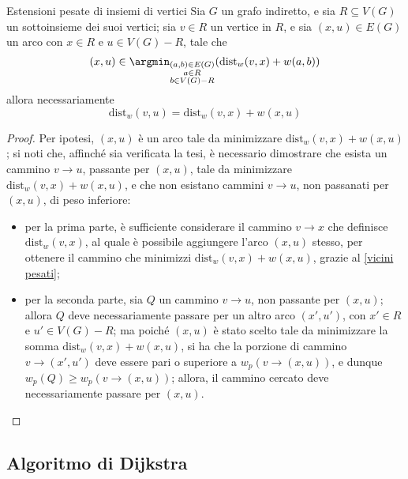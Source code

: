 \documentclass[a4paper, 12pt]{report}
\begin{document}
    \begin{framedthm}[label={dijkstra theorem}]{Estensioni pesate di insiemi di vertici}
        Sia $G$ un grafo indiretto, e sia $R \subseteq V(G)$ un sottoinsieme dei suoi vertici; sia $v\in R$ un vertice in $R$, e sia $(x, u) \in E(G)$ un arco con $x \in R$ e $u \in V(G) - R$, tale che $$(x, u) \in \argmin_{\substack{(a, b) \in E(G) \\ a \in R \\ b \in V(G) - R}}{\left(\mathrm{dist}_w(v, x) + w(a, b)\right)}$$ allora necessariamente $$\mathrm{dist}_w(v, u) = \mathrm{dist}_w(v, x) + w(x, u)$$
    \end{framedthm}

    \begin{proof}
        Per ipotesi, $(x, u)$ è un arco tale da minimizzare $\mathrm{dist}_w(v, x) + w(x, u)$; si noti che, affinché sia verificata la tesi, è necessario dimostrare che esista un cammino $v \rightarrow u$, passante per $(x, u)$, tale da minimizzare $\mathrm{dist}_w(v, x) + w(x, u)$, e che non esistano cammini $v \rightarrow u$, non passanati per $(x, u)$, di peso inferiore:

        \begin{itemize}
            \item per la prima parte, è sufficiente considerare il cammino $v \rightarrow x$ che definisce $\mathrm{dist}_w(v, x)$, al quale è possibile aggiungere l'arco $(x, u)$ stesso, per ottenere il cammino che minimizzi $\mathrm{dist}_w(v, x) + w(x, u)$, grazie al \cref{vicini pesati};
            \item per la seconda parte, sia $Q$ un cammino $v \rightarrow u$, non passante per $(x, u)$; allora $Q$ deve necessariamente passare per un altro arco $(x', u')$, con $x' \in R$ e $u' \in V(G) - R$; ma poiché $(x, u)$ è stato scelto tale da minimizzare la somma $\mathrm{dist}_w(v, x) + w(x, u)$, si ha che la porzione di cammino $v \rightarrow (x', u')$ deve essere pari o superiore a $w_p\left(v \rightarrow (x, u)\right)$, e dunque $w_p(Q) \ge w_p(v \rightarrow (x, u))$; allora, il cammino cercato deve necessariamente passare per $(x, u)$.
        \end{itemize}
    \end{proof}

    \subsection{Algoritmo di Dijkstra}
\end{document}
